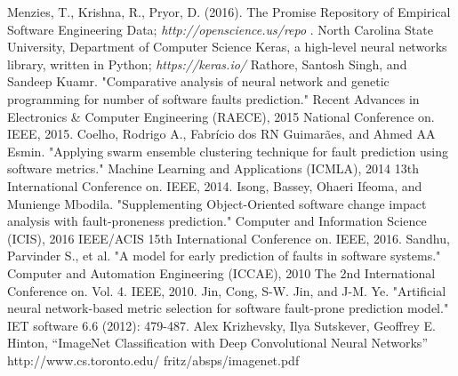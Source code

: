 \documentclass[10pt, conference, compsocconf]{IEEEtran}
\begin{document}
\begin{thebibliography}{1}
 Menzies, T., Krishna, R., Pryor, D. (2016). The Promise Repository of Empirical Software Engineering Data; { \em http://openscience.us/repo }. North Carolina State University, Department of Computer Science
 Keras, a high-level neural networks library, written in Python; { \em https://keras.io/ }
 Rathore, Santosh Singh, and Sandeep Kuamr. "Comparative analysis of neural network and genetic programming for number of software faults prediction." Recent Advances in Electronics \& Computer Engineering (RAECE), 2015 National Conference on. IEEE, 2015.
 Coelho, Rodrigo A., Fabrício dos RN Guimarães, and Ahmed AA Esmin. "Applying swarm ensemble clustering technique for fault prediction using software metrics." Machine Learning and Applications (ICMLA), 2014 13th International Conference on. IEEE, 2014.
 Isong, Bassey, Ohaeri Ifeoma, and Munienge Mbodila. "Supplementing Object-Oriented software change impact analysis with fault-proneness prediction." Computer and Information Science (ICIS), 2016 IEEE/ACIS 15th International Conference on. IEEE, 2016.
 Sandhu, Parvinder S., et al. "A model for early prediction of faults in software systems." Computer and Automation Engineering (ICCAE), 2010 The 2nd International Conference on. Vol. 4. IEEE, 2010.
 Jin, Cong, S-W. Jin, and J-M. Ye. "Artificial neural network-based metric selection for software fault-prone prediction model." IET software 6.6 (2012): 479-487.
 Alex Krizhevsky, Ilya Sutskever, Geoffrey E. Hinton, “ImageNet Classification with Deep Convolutional Neural Networks” http://www.cs.toronto.edu/ fritz/absps/imagenet.pdf
\end{thebibliography}
\end{document}
